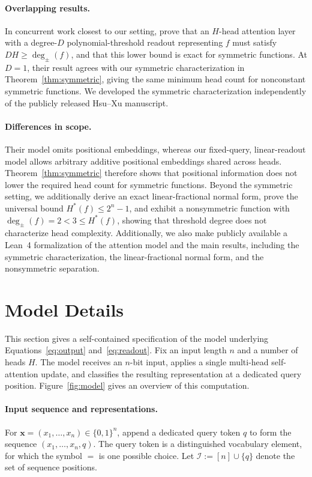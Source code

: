 \documentclass{article}
\theoremstyle{definition}
\theoremstyle{plain}
\newcommand{\hstar}{H^{\ast}}
\newcommand{\tdeg}{\deg_{\pm}}
\newcommand{\bits}{\{0,1\}}
\begin{document}
\paragraph{Overlapping results.}
In concurrent work closest to our setting, \citet{hsu2026attentionbased} prove that an $H$-head attention layer with a degree-$D$ polynomial-threshold readout representing $f$ must satisfy $DH\geq\tdeg(f)$, and that this lower bound is exact for symmetric functions. At $D=1$, their result agrees with our symmetric characterization in Theorem~\ref{thm:symmetric}, giving the same minimum head count for nonconstant symmetric functions. We developed the symmetric characterization independently of the publicly released Hsu--Xu manuscript.

\paragraph{Differences in scope.}
Their model omits positional embeddings, whereas our fixed-query, linear-readout model allows arbitrary additive positional embeddings shared across heads. Theorem~\ref{thm:symmetric} therefore shows that positional information does not lower the required head count for symmetric functions. Beyond the symmetric setting, we additionally derive an exact linear-fractional normal form, prove the universal bound $\hstar(f)\leq 2^n-1$, and exhibit a nonsymmetric function with $\tdeg(f)=2<3\leq\hstar(f)$, showing that threshold degree does not characterize head complexity. Additionally, we also make publicly available a Lean~4 formalization of the attention model and the main results, including the symmetric characterization, the linear-fractional normal form, and the nonsymmetric separation.

\section{Model Details}
\label{app:model-details}

This section gives a self-contained specification of the model underlying Equations~\eqref{eq:output} and~\eqref{eq:readout}. Fix an input length $n$ and a number of heads $H$. The model receives an $n$-bit input, applies a single multi-head self-attention update, and classifies the resulting representation at a dedicated query position. Figure~\ref{fig:model} gives an overview of this computation.

\paragraph{Input sequence and representations.}
For $\mathbf{x}=(x_1,\ldots,x_n)\in\bits^n$, append a dedicated query token $q$ to form the sequence $(x_1,\ldots,x_n,q)$. The query token is a distinguished vocabulary element, for which the symbol $=$ is one possible choice. Let $\mathcal{I}:=[n]\cup\{q\}$ denote the set of sequence positions.
\end{document}

